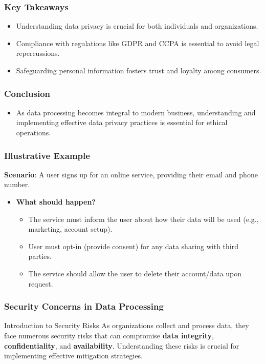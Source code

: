 \documentclass[aspectratio=169]{beamer}
\begin{document}
\begin{frame}[fragile]
    \frametitle{Key Takeaways}
    \begin{itemize}
        \item Understanding data privacy is crucial for both individuals and organizations.
        \item Compliance with regulations like GDPR and CCPA is essential to avoid legal repercussions.
        \item Safeguarding personal information fosters trust and loyalty among consumers.
    \end{itemize}
\end{frame}

\begin{frame}[fragile]
    \frametitle{Conclusion}
    \begin{itemize}
        \item As data processing becomes integral to modern business, understanding and implementing effective data privacy practices is essential for ethical operations.
    \end{itemize}
\end{frame}

\begin{frame}[fragile]
    \frametitle{Illustrative Example}
    \textbf{Scenario}: A user signs up for an online service, providing their email and phone number.
    
    \begin{itemize}
        \item \textbf{What should happen?}
        \begin{itemize}
            \item The service must inform the user about how their data will be used (e.g., marketing, account setup).
            \item User must opt-in (provide consent) for any data sharing with third parties.
            \item The service should allow the user to delete their account/data upon request.
        \end{itemize}
    \end{itemize}
\end{frame}

\begin{frame}[fragile]
    \frametitle{Security Concerns in Data Processing}
    \begin{block}{Introduction to Security Risks}
        As organizations collect and process data, they face numerous security risks that can compromise \textbf{data integrity}, \textbf{confidentiality}, and \textbf{availability}. Understanding these risks is crucial for implementing effective mitigation strategies.
    \end{block}
\end{frame}
\end{document}
